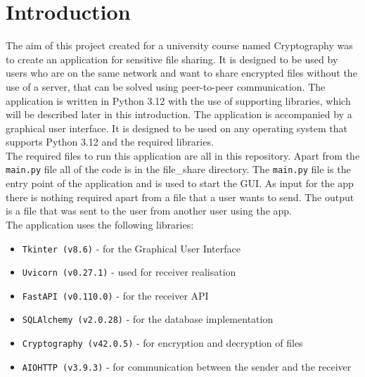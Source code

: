 \section{Introduction}
The aim of this project created for a university course named Cryptography was to create an application for sensitive file sharing. It is designed to be used by 
users who are on the same network and want to share encrypted files without the use of a server, that can be solved using peer-to-peer communication. The application is
written in Python 3.12 with the use of supporting libraries, which will be described later in this introduction. The application is accompanied by a graphical user
interface. It is designed to be used on any operating system that supports Python 3.12 and the required libraries. \\

The required files to run this application are all in this repository. Apart from the \texttt{main.py} file all of the code is in the file\_share directory.
The \texttt{main.py} file is the entry point of the application and is used to start the GUI. As input for the app there is nothing required apart from a file
that a user wants to send. The output is a file that was sent to the user from another user using the app. \\

The application uses the following libraries:
\begin{itemize}
    \item \texttt{Tkinter (v8.6)} - for the Graphical User Interface
    \item \texttt{Uvicorn (v0.27.1)} - used for receiver realisation
    \item \texttt{FastAPI (v0.110.0)} - for the receiver API
    \item \texttt{SQLAlchemy (v2.0.28)} - for the database implementation
    \item \texttt{Cryptography (v42.0.5)} - for encryption and decryption of files
    \item \texttt{AIOHTTP (v3.9.3)} - for communication between the sender and the receiver
\end{itemize}